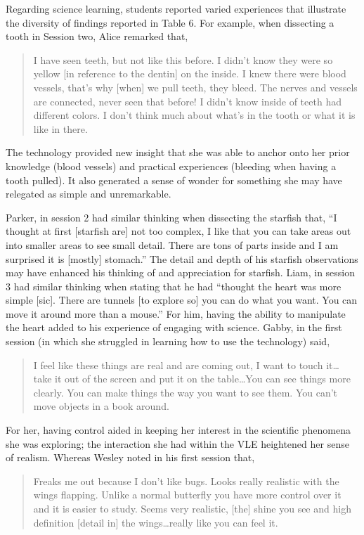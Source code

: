 \documentclass[11.5pt]{sig-alternate} %
\begin{document}
\begin{large}
Regarding science learning, students reported varied experiences that illustrate the diversity of findings reported in Table 6. For example, when dissecting a tooth in Session two, Alice remarked that, 
\begin{quote}
    I have seen teeth, but not like this before. I didn’t know they were so yellow [in reference to the dentin] on the inside. I knew there were blood vessels, that’s why [when] we pull teeth, they bleed. The nerves and vessels are connected, never seen that before! I didn’t know inside of teeth had different colors. I don’t think much about what’s in the tooth or what it is like in there.
\end{quote}

The technology provided new insight that she was able to anchor onto her prior knowledge (blood vessels) and practical experiences (bleeding when having a tooth pulled). It also generated a sense of wonder for something she may have relegated as simple and unremarkable.  

Parker, in session 2 had similar thinking when dissecting the starfish that, “I thought at first [starfish are] not too complex, I like that you can take areas out into smaller areas to see small detail. There are tons of parts inside and I am surprised it is 	[mostly] stomach.” The detail and depth of his starfish observations may have enhanced his thinking of and appreciation for starfish. Liam, in session 3 had similar thinking when stating that he had “thought the heart was more simple [sic]. There are tunnels [to explore so] you can do what you want. You can move it around more than a mouse.” For him, having the ability to manipulate the heart added to his experience of engaging with science. Gabby, in the first session (in which she struggled in learning how to use the technology) said, 
\begin{quote}
I feel like these things are real and are coming out, I want to touch it… take it out of the screen and put it on the table…You can see things more clearly. You can make things the way you want to see them. You can’t move objects in a book around.
\end{quote}

For her, having control aided in keeping her interest in the scientific phenomena she was exploring; the interaction she had within the VLE heightened her sense of realism. Whereas Wesley noted in his first session that, 
\begin{quote}
Freaks me out because I don’t like bugs. Looks really realistic with the wings flapping. Unlike a normal butterfly you have more control over it and it is easier to study. Seems very realistic, [the] shine you see and high definition [detail in] the wings…really like you can feel it. 
\end{quote}


\end{large}
\end{document}
